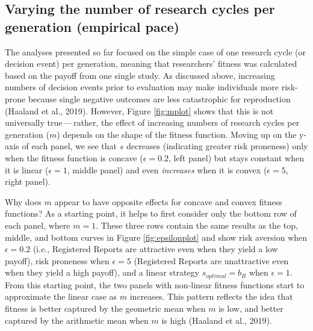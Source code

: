 \documentclass[
  british,
  a4paper,
  ,man,mask,floatsintext]{apa6}
\begin{document}
\subsection{Varying the number of research cycles per generation (empirical pace)}\label{varying-the-number-of-research-cycles-per-generation-empirical-pace}

The analyses presented so far focused on the simple case of one research cycle (or decision event) per generation, meaning that researchers' fitness was calculated based on the payoff from one single study.
As discussed above, increasing numbers of decision events prior to evaluation may make individuals more risk-prone because single negative outcomes are less catastrophic for reproduction (Haaland et al., 2019).
However, Figure \ref{fig:mplot} shows that this is not universally true\(\,\)---\(\,\)rather, the effect of increasing numbers of research cycles per generation (\(m\)) depends on the shape of the fitness function.
Moving up on the y-axis of each panel, we see that \(s\) decreases (indicating greater risk proneness) only when the fitness function is concave (\(\epsilon = 0.2\), left panel) but stays constant when it is linear (\(\epsilon = 1\), middle panel) and even \emph{increases} when it is convex (\(\epsilon = 5\), right panel).

Why does \(m\) appear to have opposite effects for concave and convex fitness functions?
As a starting point, it helps to first consider only the bottom row of each panel, where \(m = 1\).
These three rows contain the same results as the top, middle, and bottom curves in Figure \ref{fig:epsilonplot} and show risk aversion when \(\epsilon = 0.2\) (i.e., Registered Reports are attractive even when they yield a low payoff), risk proneness when \(\epsilon = 5\) (Registered Reports are unattractive even when they yield a high payoff), and a linear strategy \(s_{optimal} = b_{R}\) when \(\epsilon = 1\).
From this starting point, the two panels with non-linear fitness functions start to approximate the linear case as \(m\) increases.
This pattern reflects the idea that fitness is better captured by the geometric mean when \(m\) is low, and better captured by the arithmetic mean when \(m\) is high (Haaland et al., 2019).
\end{document}
